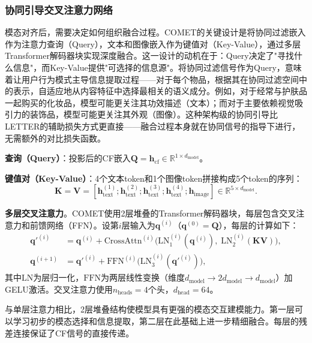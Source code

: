 \subsubsection{协同引导交叉注意力网络}

模态对齐后，需要决定如何组织融合过程。COMET的关键设计是将协同过滤嵌入作为注意力查询（Query），文本和图像嵌入作为键值对（Key-Value），通过多层Transformer解码器块实现深度融合。这一设计的动机在于：Query决定了"寻找什么信息"，而Key-Value提供"可选择的信息源"。将协同过滤信号作为Query，意味着让用户行为模式主导信息提取过程——对于每个物品，根据其在协同过滤空间中的表示，自适应地从内容特征中选择最相关的语义成分。例如，对于经常与护肤品一起购买的化妆品，模型可能更关注其功效描述（文本）；而对于主要依赖视觉吸引力的装饰品，模型可能更关注其外观（图像）。这种架构级的协同引导比LETTER的辅助损失方式更直接——融合过程本身就在协同信号的指导下进行，无需额外的对比损失函数。

\textbf{查询（Query）}：投影后的CF嵌入$\mathbf{Q} = \mathbf{h}_{\text{cf}} \in \mathbb{R}^{1 \times d_{\text{model}}}$。

\textbf{键值对（Key-Value）}：4个文本token和1个图像token拼接构成5个token的序列：
\begin{equation}
  \mathbf{K} = \mathbf{V} = [\mathbf{h}_{\text{text}}^{(1)}; \mathbf{h}_{\text{text}}^{(2)}; \mathbf{h}_{\text{text}}^{(3)}; \mathbf{h}_{\text{text}}^{(4)}; \mathbf{h}_{\text{image}}] \in \mathbb{R}^{5 \times d_{\text{model}}}.
\end{equation}

\textbf{多层交叉注意力}。COMET使用2层堆叠的Transformer解码器块，每层包含交叉注意力和前馈网络（FFN）。设第$i$层输入为$\mathbf{q}^{(i)}$（$\mathbf{q}^{(0)} = \mathbf{Q}$），每层的计算如下：
\begin{align}
  \mathbf{q}'^{(i)} &= \mathbf{q}^{(i)} + \text{CrossAttn}^{(i)}\bigl(\text{LN}_1^{(i)}(\mathbf{q}^{(i)}),\; \text{LN}_2^{(i)}(\mathbf{KV})\bigr), \label{eq:preln-attn} \\
  \mathbf{q}^{(i+1)} &= \mathbf{q}'^{(i)} + \text{FFN}^{(i)}\bigl(\text{LN}_3^{(i)}(\mathbf{q}'^{(i)})\bigr), \label{eq:preln-ffn}
\end{align}
其中$\text{LN}$为层归一化，$\text{FFN}$为两层线性变换（维度$d_{\text{model}} \to 2 d_{\text{model}} \to d_{\text{model}}$）加GELU激活。交叉注意力使用$n_{\text{heads}}=4$个头，$d_{\text{head}}=64$。

与单层注意力相比，2层堆叠结构使模型具有更强的模态交互建模能力。第一层可以学习初步的模态选择和信息提取，第二层在此基础上进一步精细融合。每层的残差连接保证了CF信号的直接传递。

